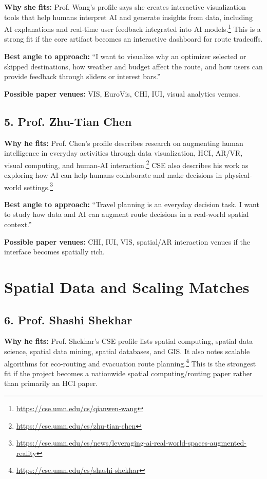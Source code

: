 \documentclass[11pt,a4paper]{article}
\begin{document}
\noindent \textbf{Why she fits:} Prof. Wang's profile says she creates interactive visualization tools that help humans interpret AI and generate insights from data, including AI explanations and real-time user feedback integrated into AI models.\footnote{\url{https://cse.umn.edu/cs/qianwen-wang}} This is a strong fit if the core artifact becomes an interactive dashboard for route tradeoffs.

\noindent \textbf{Best angle to approach:} ``I want to visualize why an optimizer selected or skipped destinations, how weather and budget affect the route, and how users can provide feedback through sliders or interest bars.''

\noindent \textbf{Possible paper venues:} VIS, EuroVis, CHI, IUI, visual analytics venues.

\subsection*{5. Prof. Zhu-Tian Chen}

\noindent \textbf{Why he fits:} Prof. Chen's profile describes research on augmenting human intelligence in everyday activities through data visualization, HCI, AR/VR, visual computing, and human-AI interaction.\footnote{\url{https://cse.umn.edu/cs/zhu-tian-chen}} CSE also describes his work as exploring how AI can help humans collaborate and make decisions in physical-world settings.\footnote{\url{https://cse.umn.edu/cs/news/leveraging-ai-real-world-spaces-augmented-reality}}

\noindent \textbf{Best angle to approach:} ``Travel planning is an everyday decision task. I want to study how data and AI can augment route decisions in a real-world spatial context.''

\noindent \textbf{Possible paper venues:} CHI, IUI, VIS, spatial/AR interaction venues if the interface becomes spatially rich.

\section*{Spatial Data and Scaling Matches}

\subsection*{6. Prof. Shashi Shekhar}

\noindent \textbf{Why he fits:} Prof. Shekhar's CSE profile lists spatial computing, spatial data science, spatial data mining, spatial databases, and GIS. It also notes scalable algorithms for eco-routing and evacuation route planning.\footnote{\url{https://cse.umn.edu/cs/shashi-shekhar}} This is the strongest fit if the project becomes a nationwide spatial computing/routing paper rather than primarily an HCI paper.
\end{document}
